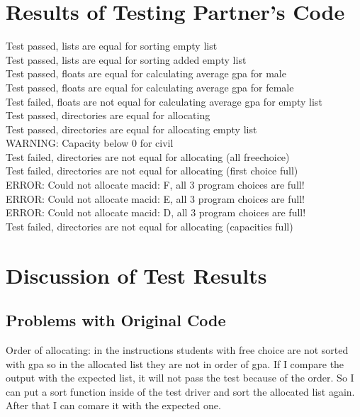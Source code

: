 \documentclass[12pt]{article}
\begin{document}
\section{Results of Testing Partner's Code}

Test passed, lists are equal for sorting empty list\\
Test passed, lists are equal for sorting added empty list\\
Test passed, floats are equal for calculating average gpa for male\\
Test passed, floats are equal for calculating average gpa for female\\
Test failed, floats are not equal for calculating average gpa for empty list\\
Test passed, directories are equal for allocating\\
Test passed, directories are equal for allocating empty list\\
WARNING: Capacity below 0 for civil\\
Test failed, directories are not equal for allocating (all freechoice)\\
Test failed, directories are not equal for allocating (first choice full)\\
ERROR: Could not allocate macid: F, all 3 program choices are full!\\
ERROR: Could not allocate macid: E, all 3 program choices are full!\\
ERROR: Could not allocate macid: D, all 3 program choices are full!\\
Test failed, directories are not equal for allocating (capacities full)\\


\section{Discussion of Test Results}

\subsection{Problems with Original Code}
Order of allocating: in the instructions students with free choice are not sorted with gpa so in the allocated list they are not in order of gpa. If I compare the output with the expected list, it will not pass the test because of the order. So I can put a sort function inside of the test driver and sort the allocated list again. After that I can comare it with the expected one.
\end{document}
